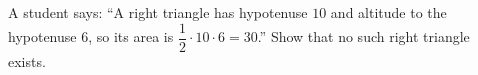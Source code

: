 A student says: ``A right triangle has hypotenuse $10$ and altitude to the hypotenuse $6$, so its area is $\dfrac12\cdot10\cdot6=30$.'' Show that no such right triangle exists.
